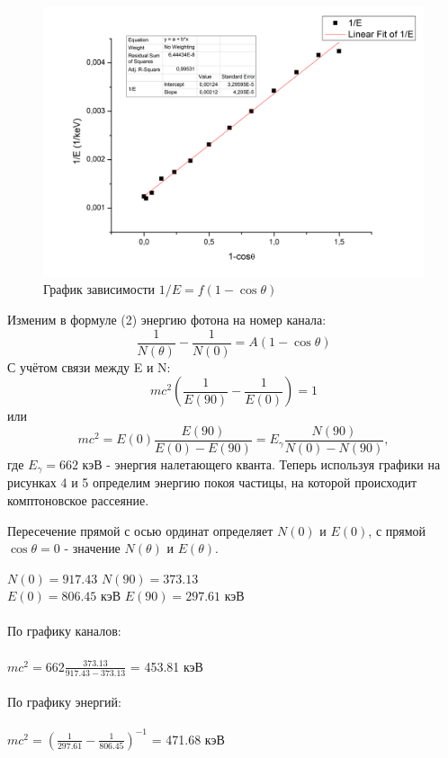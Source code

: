 \documentclass[a4paper]{article}
\begin{document}
    \begin{figure}[h]
\begin{center}
\includegraphics[width=12cm]{E.png}
\caption{График зависимости $1/E = f(1-\cos \theta)$}
\label{ris:experimoriginal} %
\end{center}
\end{figure}

\clearpage

\iten Изменим в формуле (2) энергию фотона на номер канала:
\begin{equation}
    \frac{1}{N(\theta)} - \frac{1}{N(0)} = A(1 - \cos \theta)
\end{equation}
С учётом связи между E и N:
\begin{equation}
    mc^2 (\frac{1}{E(90)} - \frac{1}{E(0)}) = 1
\end{equation}
или
\begin{equation}
    mc^2 = E(0) \frac{E(90)}{E(0) - E(90)} = E_{\gamma} \frac{N(90)}{N(0) - N(90)},
\end{equation}
где $E_{\gamma} = 662$ кэВ - энергия налетающего кванта.
Теперь используя графики на рисунках 4 и 5 определим энергию покоя частицы, на которой происходит комптоновское рассеяние. \par
Пересечение прямой с осью ординат определяет $N(0)$ и $E(0)$, с прямой $\cos \theta = 0$ - значение $N(\theta)$ и $E(\theta)$.
\begin{center}
    $N(0) = 917.43$  \hspace{1cm} $N(90) = 373.13$ \\
    $E(0) = 806.45$ кэВ \hspace{1cm} $E(90) = 297.61$ кэВ \\
    \\
    По графику каналов: \\
    \\
    $mc^2 = 662 \frac{373.13}{917.43-373.13}$ = 453.81 кэВ \\
    \\
    По графику энергий: \\
    \\
    $mc^2 = (\frac{1}{297.61} - \frac{1}{806.45})^{-1}$ = 471.68 кэВ
\end{center}
\end{document}
